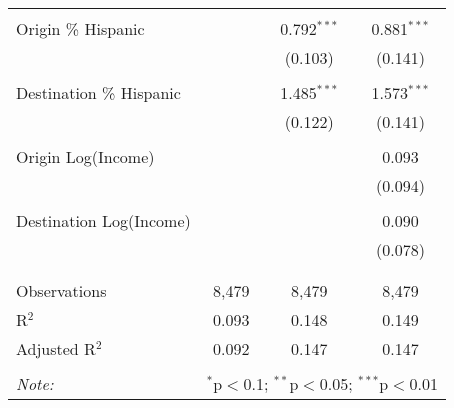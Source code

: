 \begin{table}[!htbp]
\begin{tabular}{@{\extracolsep{5pt}}lccc}
  & & & \\ 
 Origin \% Hispanic &  & 0.792$^{***}$ & 0.881$^{***}$ \\ 
  &  & (0.103) & (0.141) \\ 
  & & & \\ 
 Destination \% Hispanic &  & 1.485$^{***}$ & 1.573$^{***}$ \\ 
  &  & (0.122) & (0.141) \\ 
  & & & \\ 
 Origin Log(Income) &  &  & 0.093 \\ 
  &  &  & (0.094) \\ 
  & & & \\ 
 Destination Log(Income) &  &  & 0.090 \\ 
  &  &  & (0.078) \\ 
  & & & \\ 
\hline \\[-1.8ex] 
Observations & 8,479 & 8,479 & 8,479 \\ 
R$^{2}$ & 0.093 & 0.148 & 0.149 \\ 
Adjusted R$^{2}$ & 0.092 & 0.147 & 0.147 \\ 
\hline 
\hline \\[-1.8ex] 
\textit{Note:}  & \multicolumn{3}{r}{$^{*}$p$<$0.1; $^{**}$p$<$0.05; $^{***}$p$<$0.01} \\ 
\end{tabular} 
\end{table} 
